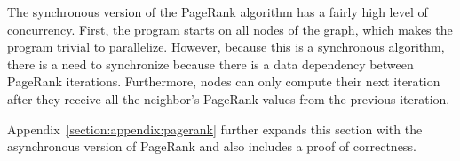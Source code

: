 The synchronous version of the PageRank algorithm has a fairly high level of
concurrency. First, the program starts on all nodes of the graph, which makes
the program trivial to parallelize. However, because this is a synchronous
algorithm, there is a need to synchronize because there is a data dependency
between PageRank iterations. Furthermore, nodes can only compute their next
iteration after they receive all the neighbor's PageRank values from the
previous iteration.

Appendix~\ref{section:appendix:pagerank} further expands this section with the
asynchronous version of PageRank and also includes a proof of correctness.

